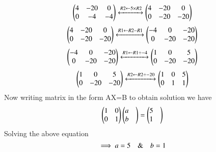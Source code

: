 \begin{align}
\begin{pmatrix}
4& -20 & 0\\
0 & -4 &-4
\end{pmatrix}
  \xleftrightarrow[]{R2 \leftarrow 5\times R2}
\begin{pmatrix}
4& -20& 0\\
0 & -20 & -20\\
\end{pmatrix}
\end{align}
\begin{align}
\begin{pmatrix}
4& -20 & 0\\
0 & -20&-20
\end{pmatrix}
  \xleftrightarrow[]{R1 \leftarrow R2-R1}
\begin{pmatrix}
-4& 0& -20\\
0 & -20 & -20\\
\end{pmatrix}
\end{align}
\begin{align}
\begin{pmatrix}
-4& 0 & -20\\
0 & -20&-20
\end{pmatrix}
  \xleftrightarrow[]{R1 \leftarrow R1\div -4}
\begin{pmatrix}
1& 0& 5\\
0 & -20 & -20\\
\end{pmatrix}
\end{align}
\begin{align}
\begin{pmatrix}
1& 0 & 5\\
0 & -20&-20
\end{pmatrix}
  \xleftrightarrow[]{R2 \leftarrow R2\div -20}
\begin{pmatrix}
1& 0& 5\\
0 & 1 & 1\\
\end{pmatrix}
\end{align}
Now writing matrix in the form AX=B to obtain solution we have
\begin{align}
\begin{pmatrix}
1 & 0\\
0& 1
\end{pmatrix}
\begin{pmatrix}
{a}& \\
{b}
\end{pmatrix}
=
\begin{pmatrix}
5&\\
1
\end{pmatrix}
\end{align}
Solving the above equation \\ 
\begin{equation} \label{eq:kvalue}
\implies \emph{a} = 5\quad \& \quad \emph{b}=1 
\end{equation}

